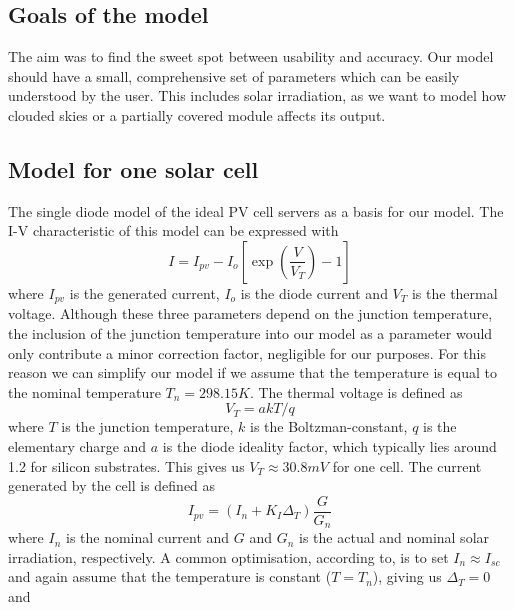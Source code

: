 \subsection{Goals of the model}

The aim  was  to  find  the sweet spot between usability and accuracy. Our model
should  have  a  small,  comprehensive  set  of parameters which can  be  easily
understood by the user. This includes solar irradiation, as we want to model how
clouded skies or a partially covered module affects its output.


\subsection{Model for one solar cell}

The single diode model of the ideal PV cell\cite{ref:villa:pvmodel} servers as a
basis for our model.  The  I-V characteristic of this model can be expressed with
\begin{equation} \label{eq:I-V_old}
    I = I_{pv} - I_o \left[ \exp \left( \frac{V}{V_T} \right) - 1 \right]
\end{equation}
where $I_{pv}$ is the generated current, $I_o$ is the diode current and $V_T$ is
the thermal  voltage.  Although  these  three  parameters depend on the junction
temperature,  the  inclusion  of  the junction temperature into our model  as  a
parameter would only contribute a minor correction factor,  negligible  for  our
purposes.  For  this  reason  we  can simplify our model if we assume  that  the
temperature is equal to  the  nominal  temperature  $T_n = 298.15K$. The thermal
voltage is defined as
\begin{equation}
    V_T = a k T / q
\end{equation}
where  $T$ is the junction temperature, $k$ is the Boltzman-constant, $q$ is the
elementary  charge  and  $a$  is the diode ideality factor, which typically lies
around 1.2 for silicon substrates. This gives us $V_T \approx  30.8mV$  for  one
cell. The current generated by the cell is defined as
\begin{equation}
    I_{pv} = \left( I_n + K_I \Delta_T \right) \frac{G}{G_n}
\end{equation}
where $I_n$ is the  nominal  current and $G$ and $G_n$ is the actual and nominal
solar   irradiation,   respectively.    A    common    optimisation,   according
to\cite{ref:villa:pvmodel}, is to set $I_n \approx I_{sc}$ and again assume that
the  temperature  is  constant  ($T  =  T_n$), giving  us  $\Delta_T  =  0$  and
